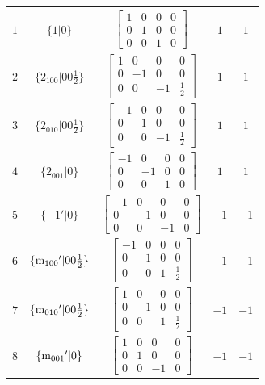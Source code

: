 \documentclass[fleqn,8pt]{jsarticle}
\begin{document}
\begin{longtable}{ccccc}
$ 1 $ & $ \{1|0\} $ & $ \begin{bmatrix} 1 & 0 & 0 & 0 \\ 0 & 1 & 0 & 0 \\ 0 & 0 & 1 & 0 \end{bmatrix} $ & $ 1 $ & $ 1 $ \\ \hline
$ 2 $ & $ \{2{}_{100}|0 0 \frac{1}{2}\} $ & $ \begin{bmatrix} 1 & 0 & 0 & 0 \\ 0 & -1 & 0 & 0 \\ 0 & 0 & -1 & \frac{1}{2} \end{bmatrix} $ & $ 1 $ & $ 1 $ \\ \hline
$ 3 $ & $ \{2{}_{010}|0 0 \frac{1}{2}\} $ & $ \begin{bmatrix} -1 & 0 & 0 & 0 \\ 0 & 1 & 0 & 0 \\ 0 & 0 & -1 & \frac{1}{2} \end{bmatrix} $ & $ 1 $ & $ 1 $ \\ \hline
$ 4 $ & $ \{2{}_{001}|0\} $ & $ \begin{bmatrix} -1 & 0 & 0 & 0 \\ 0 & -1 & 0 & 0 \\ 0 & 0 & 1 & 0 \end{bmatrix} $ & $ 1 $ & $ 1 $ \\ \hline
$ 5 $ & $ \{-1{}'|0\} $ & $ \begin{bmatrix} -1 & 0 & 0 & 0 \\ 0 & -1 & 0 & 0 \\ 0 & 0 & -1 & 0 \end{bmatrix} $ & $ -1 $ & $ -1 $ \\ \hline
$ 6 $ & $ \{{\rm m}_{100}{}'|0 0 \frac{1}{2}\} $ & $ \begin{bmatrix} -1 & 0 & 0 & 0 \\ 0 & 1 & 0 & 0 \\ 0 & 0 & 1 & \frac{1}{2} \end{bmatrix} $ & $ -1 $ & $ -1 $ \\ \hline
$ 7 $ & $ \{{\rm m}_{010}{}'|0 0 \frac{1}{2}\} $ & $ \begin{bmatrix} 1 & 0 & 0 & 0 \\ 0 & -1 & 0 & 0 \\ 0 & 0 & 1 & \frac{1}{2} \end{bmatrix} $ & $ -1 $ & $ -1 $ \\ \hline
$ 8 $ & $ \{{\rm m}_{001}{}'|0\} $ & $ \begin{bmatrix} 1 & 0 & 0 & 0 \\ 0 & 1 & 0 & 0 \\ 0 & 0 & -1 & 0 \end{bmatrix} $ & $ -1 $ & $ -1 $ \\ \hline

\end{longtable}
\end{document}

